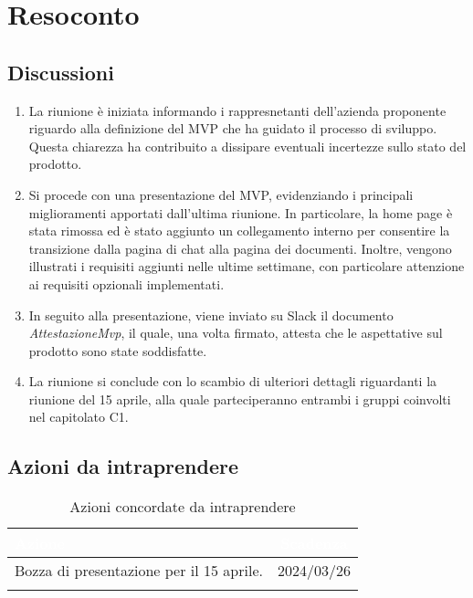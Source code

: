 \section{Resoconto} \label{sec:resoconto}
\subsection{Discussioni} \label{subsec:resdiscussione}
\begin{enumerate}
    \item La riunione è iniziata informando i rappresnetanti dell'azienda proponente riguardo alla definizione del MVP che ha guidato il processo di sviluppo. Questa chiarezza ha contribuito a dissipare eventuali incertezze sullo stato del prodotto.
    \item Si procede con una presentazione del MVP, evidenziando i principali miglioramenti apportati dall'ultima riunione. In particolare, la home page è stata rimossa ed è stato aggiunto un collegamento interno per consentire la transizione dalla pagina di chat alla pagina dei documenti. Inoltre, vengono illustrati i requisiti aggiunti nelle ultime settimane, con particolare attenzione ai requisiti opzionali implementati.
    \item In seguito alla presentazione, viene inviato su Slack il documento \textit{AttestazioneMvp}, il quale, una volta firmato, attesta che le aspettative sul prodotto sono state soddisfatte.
    \item La riunione si conclude con lo scambio di ulteriori dettagli riguardanti la riunione del 15 aprile, alla quale parteciperanno entrambi i gruppi coinvolti nel capitolato C1.
\end{enumerate}


\subsection{Azioni da intraprendere} \label{subsec:action}

{
\setlength{\tabcolsep}{10pt}
\renewcommand{\arraystretch}{1.5}
\begin{xltabular}{\textwidth}{| X | c |}
    \hline
     \textbf{\textcolor{white}{Azione}} & \textbf{\textcolor{white}{Scadenza}} \\
    \hline
    \endhead
    Bozza di presentazione per il 15 aprile.  & 2024/03/26\\
    \hline
    
     \caption{Azioni concordate da intraprendere}
    \label{tab:reqimp}
\end{xltabular}
}
